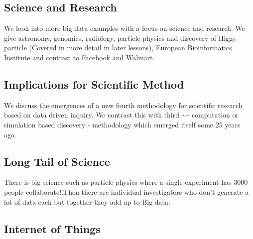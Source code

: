 

\subsection{Science and Research}\label{science-research}

We look into more big data examples with a focus on science and
research. We give astronomy, genomics, radiology, particle physics and
discovery of Higgs particle (Covered in more detail in later lessons),
European Bioinformatics Institute and contrast to Facebook and Walmart.





\subsection{Implications for Scientific
Method}\label{implications-for-scientific-method}

We discuss the emergences of a new fourth methodology for scientific
research based on data driven inquiry. We contrast this with third
\textasciitilde{}\textasciitilde{} computation or simulation based
discovery - methodology which emerged itself some 25 years ago.



\subsection{Long Tail of Science}\label{long-tail-of-science}

There is big science such as particle physics where a single experiment
has 3000 people collaborate!.Then there are individual investigators who
don't generate a lot of data each but together they add up to Big data.



\subsection{Internet of Things}\label{internet-of-things}

